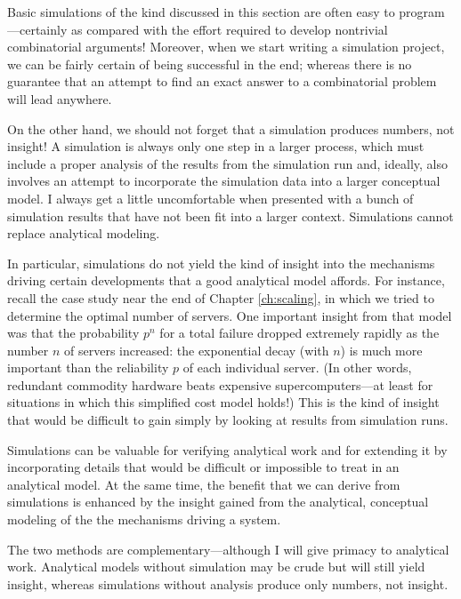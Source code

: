 Basic simulations of the kind discussed in this section are often easy
to program---certainly as compared with the effort required to develop
nontrivial combinatorial arguments! Moreover, when we start writing a
simulation project, we can be fairly certain of being successful in
the end; whereas there is no guarantee that an attempt to find an
exact answer to a combinatorial problem will lead anywhere.

On the other hand, we should not forget that a simulation produces
numbers, not insight! A simulation is always only one step in a larger
process, which must include a proper analysis of the results from the
simulation run and, ideally, also involves an attempt to incorporate
the simulation data into a larger conceptual model. I always get a
little uncomfortable when presented with a bunch of simulation results
that have not been fit into a larger context.  Simulations cannot
replace analytical modeling.

In particular, simulations do not yield the kind of insight into the
mechanisms driving certain developments that a good analytical model
affords. For instance, recall the case study near the end of Chapter
\ref{ch:scaling}, in which we tried to determine the optimal number of
servers. One important insight from that model was that the
probability $p^n$ for a total failure dropped extremely rapidly as the
number $n$ of servers increased: the exponential decay (with $n$) is
much more important than the reliability $p$ of each individual
server. (In other words, redundant commodity hardware beats expensive
supercomputers---at least for situations in which this simplified cost
model holds!) This is the kind of insight that would be difficult to
gain simply by looking at results from simulation runs.

Simulations can be valuable for verifying analytical work and for
extending it by incorporating details that would be difficult or
impossible to treat in an analytical model. At the same time, the
benefit that we can derive from simulations is enhanced by the insight
gained from the analytical, conceptual modeling of the the mechanisms
driving a system.

The two methods are complementary---although I will give primacy to
analytical work. Analytical models without simulation may be crude
but will still yield insight, whereas simulations without analysis
produce only numbers, not insight.


